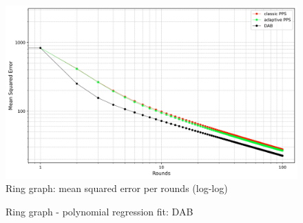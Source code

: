 \begin{figure}[]
    \centering
    \includegraphics[width=\linewidth]{figures/Simulation_outcomes/RingGraph/DAB_vs_PPS_RG_r100_n1024_averaged_loglog.png}
    \caption{Ring graph: mean squared error per rounds (log-log)}
    \label{fig:ringgraphMSEperRoundLogLog}
\end{figure}
\begin{figure}[]
    \centering
    \caption{Ring graph - polynomial regression fit: DAB}
    \label{fig:dabRingModelFit}
\end{figure}

